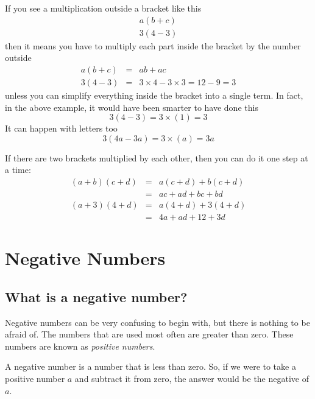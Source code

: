 \documentclass[10pt,a4paper,titlepage,twoside,openright]{report}
\begin{document}
If you see a multiplication outside a bracket like this
\begin{eqnarray}
  \label{eq:mfoundation:alg:m:bra}
  a(b+c)\\ \nonumber
  3(4-3)
\end{eqnarray}
then it means you have to multiply each part inside the bracket by the number
outside
\begin{eqnarray}
  \label{eq:mfoundation:alg:m:bra2}
  a(b+c)&=&ab+ac\\ \nonumber
  3(4-3)&=&3\times4-3\times3=12-9=3
\end{eqnarray}
unless you can simplify everything inside the bracket into a single term. In
fact, in the above example, it would have been smarter to have done this
\begin{equation}
  \label{eq:mfoundation:alg:m:bra3}
  3(4-3)=3\times(1)=3
\end{equation}
It can happen with letters too
\begin{equation}
  \label{eq:mfoundation:alg:m:bra4}
  3(4a-3a)=3\times(a)=3a
\end{equation}


If there are two brackets multiplied by each other, then you can do it one step
at a time:
\begin{eqnarray}
  \label{eq:mfoundation:alg:m:sqbra}
  (a+b)(c+d)&=&a(c+d) + b(c+d)\\ \nonumber
  &=& ac+ad+bc+bd\\ \nonumber
  (a+3)(4+d)&=&a(4+d) + 3(4+d)\\ \nonumber
  &=& 4a+ad+12+3d
\end{eqnarray}

\section{Negative Numbers}
\label{mfoundation:negative}

\subsection{What is a negative number?}
Negative numbers can be very confusing to begin with, but there is nothing to be
afraid of. The numbers that are used most often are greater than zero. These
numbers are known as \textit{positive numbers}. 

A negative number is a number that is less than zero. So, if we were to
take a positive number $a$ and subtract it from zero, the answer would be the
negative of $a$.
\end{document}
